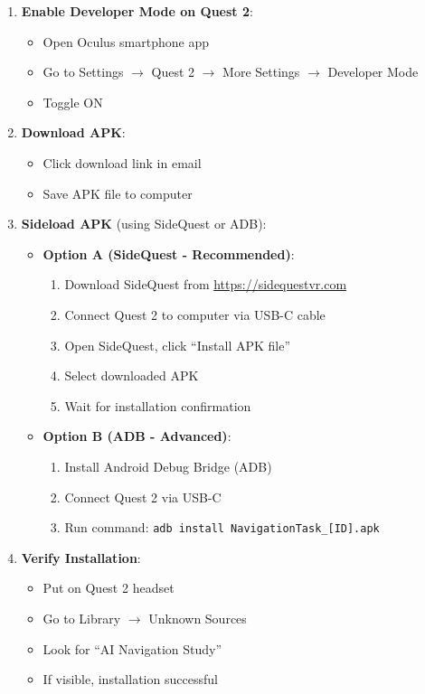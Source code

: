 \documentclass[12pt]{article}
\begin{document}
\begin{enumerate}
    \item \textbf{Enable Developer Mode on Quest 2}:
    \begin{itemize}
        \item Open Oculus smartphone app
        \item Go to Settings $\rightarrow$ Quest 2 $\rightarrow$ More Settings $\rightarrow$ Developer Mode
        \item Toggle ON
    \end{itemize}
    
    \item \textbf{Download APK}:
    \begin{itemize}
        \item Click download link in email
        \item Save APK file to computer
    \end{itemize}
    
    \item \textbf{Sideload APK} (using SideQuest or ADB):
    \begin{itemize}
        \item \textbf{Option A (SideQuest - Recommended)}:
        \begin{enumerate}
            \item Download SideQuest from \url{https://sidequestvr.com}
            \item Connect Quest 2 to computer via USB-C cable
            \item Open SideQuest, click ``Install APK file''
            \item Select downloaded APK
            \item Wait for installation confirmation
        \end{enumerate}
        
        \item \textbf{Option B (ADB - Advanced)}:
        \begin{enumerate}
            \item Install Android Debug Bridge (ADB)
            \item Connect Quest 2 via USB-C
            \item Run command: \texttt{adb install NavigationTask\_[ID].apk}
        \end{enumerate}
    \end{itemize}
    
    \item \textbf{Verify Installation}:
    \begin{itemize}
        \item Put on Quest 2 headset
        \item Go to Library $\rightarrow$ Unknown Sources
        \item Look for ``AI Navigation Study''
        \item If visible, installation successful
    \end{itemize}
\end{enumerate}
\end{document}
